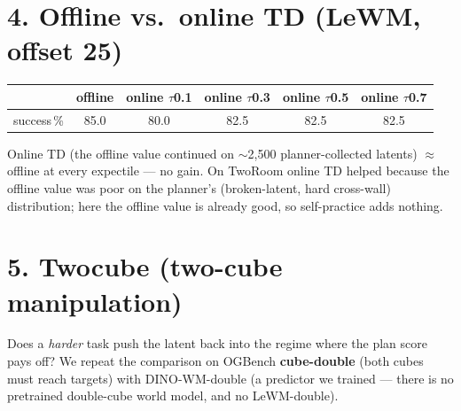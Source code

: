 \documentclass[11pt]{article}
\begin{document}
\section{4. Offline vs.\ online TD (LeWM, offset 25)}
\begin{center}\small
\renewcommand{\arraystretch}{1.2}
\begin{tabular}{l ccccc}
\toprule
 & offline & online $\tau$0.1 & online $\tau$0.3 & online $\tau$0.5 & online $\tau$0.7 \\
\midrule
success\,\% & 85.0 & 80.0 & 82.5 & 82.5 & 82.5 \\
\bottomrule
\end{tabular}
\end{center}
Online TD (the offline value continued on $\sim$2{,}500 planner-collected latents) $\approx$ offline at every
expectile --- no gain. On TwoRoom online TD helped because the offline value was poor on the planner's
(broken-latent, hard cross-wall) distribution; here the offline value is already good, so self-practice adds nothing.

\section{5. Twocube (two-cube manipulation)}
Does a \emph{harder} task push the latent back into the regime where the plan score pays off? We repeat the
comparison on OGBench \textbf{cube-double} (both cubes must reach targets) with \textsf{DINO-WM-double} (a
predictor we trained --- there is no pretrained double-cube world model, and no \textsf{LeWM-double}).
\end{document}
